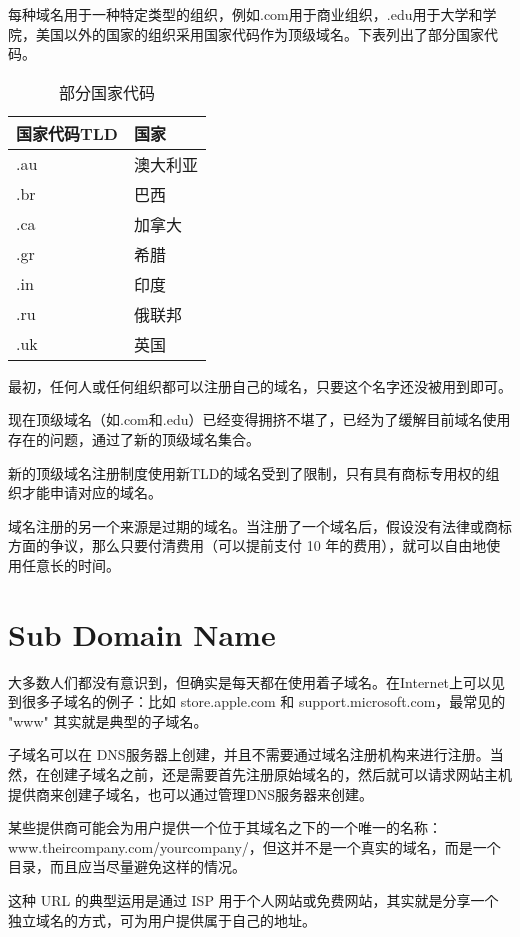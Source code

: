 每种域名用于一种特定类型的组织，例如.com用于商业组织，.edu用于大学和学院，美国以外的国家的组织采用国家代码作为顶级域名。下表列出了部分国家代码。

\begin{table}
\centering
\caption{部分国家代码}
\label{nation_code}
\begin{tabular}{|p{100pt}|p{100pt}|}
\hline
国家代码TLD	&国家\\
\hline
.au			&澳大利亚\\
\hline
.br			&巴西\\
\hline
.ca			&加拿大\\
\hline
.gr			&希腊\\
\hline
.in 			&印度\\
\hline
.ru 			&俄联邦\\
\hline
.uk 			&英国\\
\hline
\end{tabular}
\end{table}


最初，任何人或任何组织都可以注册自己的域名，只要这个名字还没被用到即可。

现在顶级域名（如.com和.edu）已经变得拥挤不堪了，已经为了缓解目前域名使用存在的问题，通过了新的顶级域名集合。

新的顶级域名注册制度使用新TLD的域名受到了限制，只有具有商标专用权的组织才能申请对应的域名。

域名注册的另一个来源是过期的域名。当注册了一个域名后，假设没有法律或商标方面的争议，那么只要付清费用（可以提前支付 10 年的费用），就可以自由地使用任意长的时间。




\section{Sub Domain Name}


大多数人们都没有意识到，但确实是每天都在使用着子域名。在Internet上可以见到很多子域名的例子：比如 store.apple.com 和 support.microsoft.com，最常见的 "www" 其实就是典型的子域名。

子域名可以在 DNS服务器上创建，并且不需要通过域名注册机构来进行注册。当然，在创建子域名之前，还是需要首先注册原始域名的，然后就可以请求网站主机提供商来创建子域名，也可以通过管理DNS服务器来创建。

某些提供商可能会为用户提供一个位于其域名之下的一个唯一的名称：www.theircompany.com/yourcompany/，但这并不是一个真实的域名，而是一个目录，而且应当尽量避免这样的情况。

这种 URL 的典型运用是通过 ISP 用于个人网站或免费网站，其实就是分享一个独立域名的方式，可为用户提供属于自己的地址。




